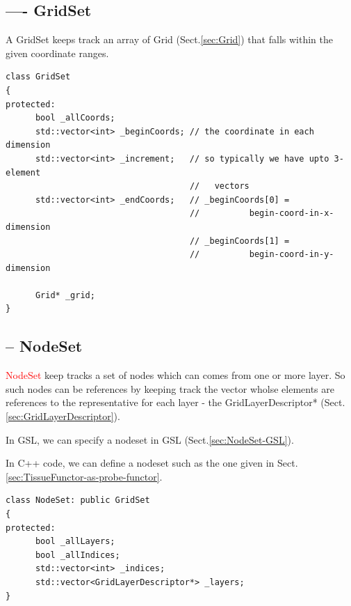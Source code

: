\subsection{---- GridSet}
\label{sec:GridSet}

A GridSet keeps track an array of Grid (Sect.\ref{sec:Grid})
that falls within the given coordinate ranges.

\begin{verbatim}
class GridSet
{
protected:
      bool _allCoords;
      std::vector<int> _beginCoords; // the coordinate in each dimension
      std::vector<int> _increment;   // so typically we have upto 3-element
                                     //   vectors
      std::vector<int> _endCoords;   // _beginCoords[0] =
                                     //          begin-coord-in-x-dimension
                                     // _beginCoords[1] =
                                     //          begin-coord-in-y-dimension
      
      Grid* _grid;
}
\end{verbatim}

\subsection{-- NodeSet}
\label{sec:NodeSet}

\textcolor{red}{NodeSet} keep tracks a set of nodes which can comes from one or
more layer. So such nodes can be references by keeping track the vector wholse
elements are references to the representative for each layer - the
GridLayerDescriptor* (Sect.\ref{sec:GridLayerDescriptor}).

In GSL, we can specify a nodeset in GSL (Sect.\ref{sec:NodeSet-GSL}). 

In C++ code, we can define a nodeset such as the one given in
Sect.\ref{sec:TissueFunctor-as-probe-functor}.

\begin{verbatim}
class NodeSet: public GridSet
{
protected:
      bool _allLayers;
      bool _allIndices;
      std::vector<int> _indices;
      std::vector<GridLayerDescriptor*> _layers;
}
\end{verbatim}

